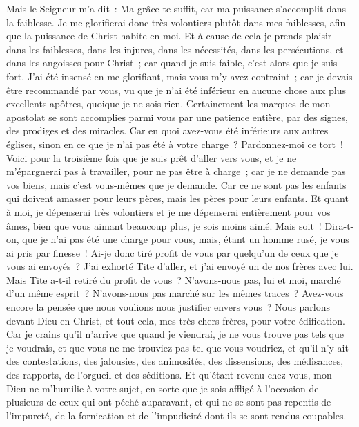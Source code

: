\begin{multicols}{2}
Mais le Seigneur m'a dit~: Ma grâce te suffit, car ma puissance s'accomplit dans la faiblesse. Je me glorifierai donc très volontiers plutôt dans mes faiblesses, afin que la puissance de Christ habite en moi.
Et à cause de cela je prends plaisir dans les faiblesses, dans les injures, dans les nécessités, dans les persécutions, et dans les angoisses pour Christ~; car quand je suis faible, c'est alors que je suis fort.
J'ai été insensé en me glorifiant, mais vous m'y avez contraint~; car je devais être recommandé par vous, vu que je n'ai été inférieur en aucune chose aux plus excellents apôtres, quoique je ne sois rien.
Certainement les marques de mon apostolat se sont accomplies parmi vous par une patience entière, par des signes, des prodiges et des miracles.
Car en quoi avez-vous été inférieurs aux autres églises, sinon en ce que je n'ai pas été à votre charge~? Pardonnez-moi ce tort~!
Voici pour la troisième fois que je suis prêt d'aller vers vous, et je ne m'épargnerai pas à travailler, pour ne pas être à charge~; car je ne demande pas vos biens, mais c'est vous-mêmes que je demande. Car ce ne sont pas les enfants qui doivent amasser pour leurs pères, mais les pères pour leurs enfants.
Et quant à moi, je dépenserai très volontiers et je me dépenserai entièrement pour vos âmes, bien que vous aimant beaucoup plus, je sois moins aimé.
Mais soit~! Dira-t-on, que je n'ai pas été une charge pour vous, mais, étant un homme rusé, je vous ai pris par finesse~!
Ai-je donc tiré profit de vous par quelqu'un de ceux que je vous ai envoyés~?
J'ai exhorté Tite d'aller, et j'ai envoyé un de nos frères avec lui. Mais Tite a-t-il retiré du profit de vous~? N'avons-nous pas, lui et moi, marché d'un même esprit~? N'avons-nous pas marché sur les mêmes traces~?
Avez-vous encore la pensée que nous voulions nous justifier envers vous~? Nous parlons devant Dieu en Christ, et tout cela, mes très chers frères, pour votre édification.
Car je crains qu'il n'arrive que quand je viendrai, je ne vous trouve pas tels que je voudrais, et que vous ne me trouviez pas tel que vous voudriez, et qu'il n'y ait des contestations, des jalousies, des animosités, des dissensions, des médisances, des rapports, de l'orgueil et des séditions.
Et qu'étant revenu chez vous, mon Dieu ne m'humilie à votre sujet, en sorte que je sois affligé à l'occasion de plusieurs de ceux qui ont péché auparavant, et qui ne se sont pas repentis de l'impureté, de la fornication et de l'impudicité dont ils se sont rendus coupables.

\end{multicols}
